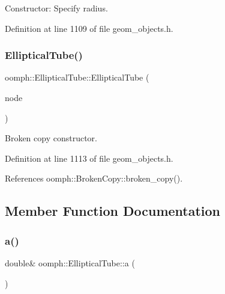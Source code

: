Constructor\+: Specify radius. 



Definition at line 1109 of file geom\+\_\+objects.\+h.

\mbox{\label{classoomph_1_1EllipticalTube_a6b8312c32c02f67ba2a716e77f048a1f}} 
\subsubsection{\texorpdfstring{Elliptical\+Tube()}{EllipticalTube()}\hspace{0.1cm}{\footnotesize\ttfamily [2/2]}}
{\footnotesize\ttfamily oomph\+::\+Elliptical\+Tube\+::\+Elliptical\+Tube (\begin{DoxyParamCaption}\item[{const \hyperlink{classoomph_1_1EllipticalTube}{Elliptical\+Tube} \&}]{node }\end{DoxyParamCaption})\hspace{0.3cm}{\ttfamily [inline]}}



Broken copy constructor. 



Definition at line 1113 of file geom\+\_\+objects.\+h.



References oomph\+::\+Broken\+Copy\+::broken\+\_\+copy().



\subsection{Member Function Documentation}
\mbox{\label{classoomph_1_1EllipticalTube_a32555e753aaaf305979520c06b26755e}} 
\subsubsection{\texorpdfstring{a()}{a()}}
{\footnotesize\ttfamily double\& oomph\+::\+Elliptical\+Tube\+::a (\begin{DoxyParamCaption}{ }\end{DoxyParamCaption})\hspace{0.3cm}{\ttfamily [inline]}}



